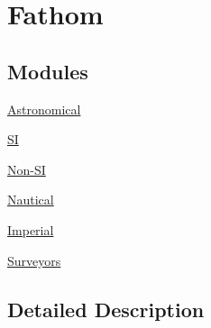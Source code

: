 \hypertarget{group___e_g_x_math-_conversions-_length_conversions-_nautical-_fathom}{}\section{Fathom}
\label{group___e_g_x_math-_conversions-_length_conversions-_nautical-_fathom}
\subsection*{Modules}
\begin{DoxyCompactItemize}
\item 
\mbox{\hyperlink{group___e_g_x_math-_conversions-_length_conversions-_nautical-_fathom-_astronomical}{Astronomical}}
\item 
\mbox{\hyperlink{group___e_g_x_math-_conversions-_length_conversions-_nautical-_fathom-_s_i}{SI}}
\item 
\mbox{\hyperlink{group___e_g_x_math-_conversions-_length_conversions-_nautical-_fathom-_non-_s_i}{Non-\/\+SI}}
\item 
\mbox{\hyperlink{group___e_g_x_math-_conversions-_length_conversions-_nautical-_fathom-_nautical}{Nautical}}
\item 
\mbox{\hyperlink{group___e_g_x_math-_conversions-_length_conversions-_nautical-_fathom-_imperial}{Imperial}}
\item 
\mbox{\hyperlink{group___e_g_x_math-_conversions-_length_conversions-_nautical-_fathom-_surveyors}{Surveyors}}
\end{DoxyCompactItemize}


\subsection{Detailed Description}
